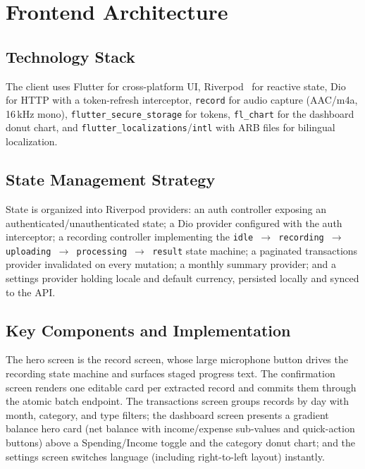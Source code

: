 \section{Frontend Architecture}

\subsection{Technology Stack}

The client uses Flutter for cross-platform UI, Riverpod~\cite{riverpod} for
reactive state, Dio for HTTP with a token-refresh interceptor, \texttt{record} for
audio capture (AAC/m4a, 16\,kHz mono), \texttt{flutter\_secure\_storage} for
tokens, \texttt{fl\_chart} for the dashboard donut chart, and
\texttt{flutter\_localizations}/\texttt{intl} with ARB files for bilingual
localization.

\subsection{State Management Strategy}

State is organized into Riverpod providers: an auth controller exposing an
authenticated/unauthenticated state; a Dio provider configured with the
auth interceptor; a recording controller implementing the
\texttt{idle\,$\rightarrow$\,recording\,$\rightarrow$\,uploading\,$\rightarrow$\,processing\,$\rightarrow$\,result}
state machine; a paginated transactions provider invalidated on every mutation;
a monthly summary provider; and a settings provider holding locale and default
currency, persisted locally and synced to the API.

\subsection{Key Components and Implementation}

The hero screen is the record screen, whose large microphone button drives the
recording state machine and surfaces staged progress text. The confirmation
screen renders one editable card per extracted record and commits them through the
atomic batch endpoint. The transactions screen groups records by day with month,
category, and type filters; the dashboard screen presents a gradient balance
hero card (net balance with income/expense sub-values and quick-action
buttons) above a Spending/Income toggle and the category donut chart; and the
settings screen switches language (including right-to-left layout) instantly.

